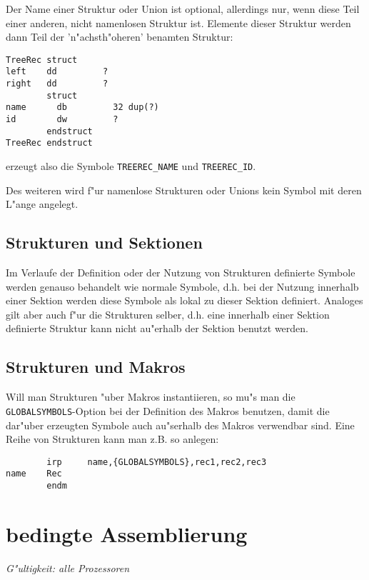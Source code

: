\documentclass[12pt,a4paper,twoside]{report}
\newcommand{\tty}[1]{{\tt #1}}
\begin{document}
{Der Name einer Struktur oder Union ist optional, allerdings nur, wenn
diese Teil einer anderen, nicht namenlosen Struktur ist.  Elemente
dieser Struktur werden dann Teil der 'n"achsth"oheren' benamten
Struktur:
\begin{verbatim}
TreeRec struct  
left    dd         ?
right   dd         ?
        struct
name      db         32 dup(?)
id        dw         ?
        endstruct
TreeRec endstruct
\end{verbatim}
erzeugt also die Symbole {\tt TREEREC\_NAME} und {\tt TREEREC\_ID}. 

Des weiteren wird f"ur namenlose Strukturen oder Unions kein Symbol
mit deren L"ange angelegt.

\subsection{Strukturen und Sektionen}

Im Verlaufe der Definition oder der Nutzung von Strukturen definierte
Symbole werden genauso behandelt wie normale Symbole, d.h. bei der Nutzung
innerhalb einer Sektion werden diese Symbole als lokal zu dieser Sektion
definiert.  Analoges gilt aber auch f"ur die Strukturen selber, d.h. eine
innerhalb einer Sektion definierte Struktur kann nicht au"erhalb der
Sektion benutzt werden.

\subsection{Strukturen und Makros}

Will man Strukturen "uber Makros instantiieren, so mu"s man die
\tty{GLOBALSYMBOLS}-Option bei der Definition des Makros
benutzen, damit die dar"uber erzeugten Symbole auch au"serhalb
des Makros verwendbar sind.  Eine Reihe von Strukturen kann man
z.B. so anlegen:

\begin{verbatim}
        irp     name,{GLOBALSYMBOLS},rec1,rec2,rec3
name    Rec
        endm
\end{verbatim}


\section{bedingte Assemblierung}

{\em G"ultigkeit: alle Prozessoren}

}
\end{document}
